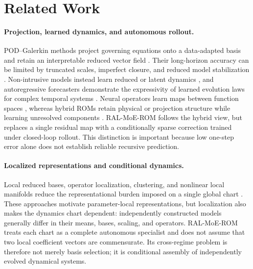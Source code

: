 \section{Related Work}

\paragraph{Projection, learned dynamics, and autonomous rollout.}
POD--Galerkin methods project governing equations onto a data-adapted basis and retain an
interpretable reduced vector field \citep{sirovich1987,berkooz1993,benner2015}. Their
long-horizon accuracy can be limited by truncated scales, imperfect closure, and reduced
model stabilization \citep{amsallem2012}. Non-intrusive models instead learn reduced or
latent dynamics \citep{hesthaven2018,lee2020,champion2019,park2024}, and autoregressive
forecasters demonstrate the expressivity of learned evolution laws for complex temporal
systems \citep{pathak2018,vlachas2018}. Neural operators learn maps between function
spaces \citep{lu2021,kovachki2023}, whereas hybrid ROMs retain physical or projection
structure while learning unresolved components
\citep{duraisamy2019,brunton2020,dar2023,fresca2022,geelen2023}. RAL-MoE-ROM follows the
hybrid view, but replaces a single residual map with a conditionally sparse correction
trained under closed-loop rollout. This distinction is important because low one-step
error alone does not establish reliable recursive prediction.

\paragraph{Localized representations and conditional dynamics.}
Local reduced bases, operator localization, clustering, and nonlinear local manifolds
reduce the representational burden imposed on a single global chart
\citep{amsallem2008,peherstorfer2014,kaiser2014,li2021cluster,diaz2024}. These approaches
motivate parameter-local representations, but localization also makes the dynamics
chart dependent: independently constructed models generally differ in their means,
bases, scaling, and operators. RAL-MoE-ROM treats each chart as a complete autonomous
specialist and does not assume that two local coefficient vectors are commensurate. Its
cross-regime problem is therefore not merely basis selection; it is conditional assembly
of independently evolved dynamical systems.

